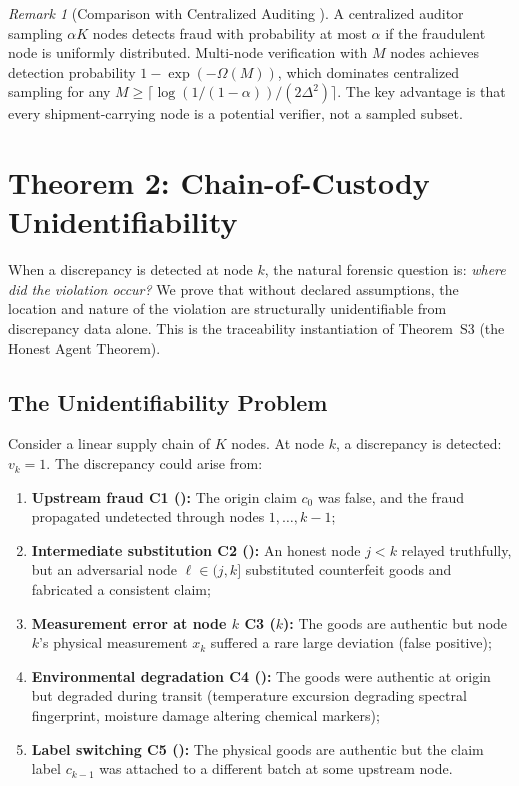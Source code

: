 \documentclass[11pt,a4paper]{article}
\theoremstyle{definition}
\theoremstyle{remark}
\newtheorem{remark}[theorem]{Remark}
\newcommand{\ThmSCXHonest}{Theorem~S3}
\begin{document}
\begin{remark}[Comparison with Centralized Auditing ]
\label{rem:centralized_comparison}
A centralized auditor sampling $\alpha K$ nodes detects fraud with probability at most $\alpha$ if the fraudulent node is uniformly distributed. Multi-node verification with $M$ nodes achieves detection probability $1 - \exp(-\Omega(M))$, which dominates centralized sampling for any $M \geq \lceil \log(1/(1-\alpha)) / (2\Delta^2) \rceil$. The key advantage is that every shipment-carrying node is a potential verifier, not a sampled subset.
\end{remark}

\section{Theorem 2: Chain-of-Custody Unidentifiability }
\label{sec:theorem2}

When a discrepancy is detected at node $k$, the natural forensic question is: \textit{where did the violation occur?} We prove that without declared assumptions, the location and nature of the violation are structurally unidentifiable from discrepancy data alone. This is the traceability instantiation of \ThmSCXHonest{} (the Honest Agent Theorem).

\subsection{The Unidentifiability Problem}

Consider a linear supply chain of $K$ nodes. At node $k$, a discrepancy is detected: $v_k = 1$. The discrepancy could arise from:

\begin{enumerate}[label=(C\arabic*)]
    \item \textbf{Upstream fraud C1 ():} The origin claim $c_0$ was false, and the fraud propagated undetected through nodes $1, \ldots, k-1$;
    \item \textbf{Intermediate substitution C2 ():} An honest node $j < k$ relayed truthfully, but an adversarial node $\ell \in (j, k]$ substituted counterfeit goods and fabricated a consistent claim;
    \item \textbf{Measurement error at node $k$ C3 ($k$):} The goods are authentic but node $k$'s physical measurement $x_k$ suffered a rare large deviation (false positive);
    \item \textbf{Environmental degradation C4 ():} The goods were authentic at origin but degraded during transit (temperature excursion degrading spectral fingerprint, moisture damage altering chemical markers);
    \item \textbf{Label switching C5 ():} The physical goods are authentic but the claim label $c_{k-1}$ was attached to a different batch at some upstream node.
\end{enumerate}
\end{document}
